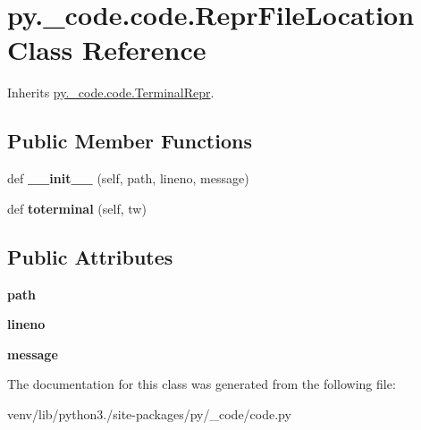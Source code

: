 \hypertarget{classpy_1_1__code_1_1code_1_1_repr_file_location}{}\section{py.\+\_\+code.\+code.\+Repr\+File\+Location Class Reference}
\label{classpy_1_1__code_1_1code_1_1_repr_file_location}


Inherits \hyperlink{classpy_1_1__code_1_1code_1_1_terminal_repr}{py.\+\_\+code.\+code.\+Terminal\+Repr}.

\subsection*{Public Member Functions}
\begin{DoxyCompactItemize}
\item 
\mbox{\label{classpy_1_1__code_1_1code_1_1_repr_file_location_a75da52f881af44cad808357e0c463005}} 
def {\bfseries \+\_\+\+\_\+init\+\_\+\+\_\+} (self, path, lineno, message)
\item 
\mbox{\label{classpy_1_1__code_1_1code_1_1_repr_file_location_a3f8a0f8df7a8f994e9f1c3e090e9ff39}} 
def {\bfseries toterminal} (self, tw)
\end{DoxyCompactItemize}
\subsection*{Public Attributes}
\begin{DoxyCompactItemize}
\item 
\mbox{\label{classpy_1_1__code_1_1code_1_1_repr_file_location_a54640a64309cdf56f14694bc6c016757}} 
{\bfseries path}
\item 
\mbox{\label{classpy_1_1__code_1_1code_1_1_repr_file_location_a0a6acd851441d19039c2c940dfb3a759}} 
{\bfseries lineno}
\item 
\mbox{\label{classpy_1_1__code_1_1code_1_1_repr_file_location_af0ecbf620b53798425404111e82c22da}} 
{\bfseries message}
\end{DoxyCompactItemize}


The documentation for this class was generated from the following file\+:\begin{DoxyCompactItemize}
\item 
venv/lib/python3./site-\/packages/py/\+\_\+code/code.\+py\end{DoxyCompactItemize}
